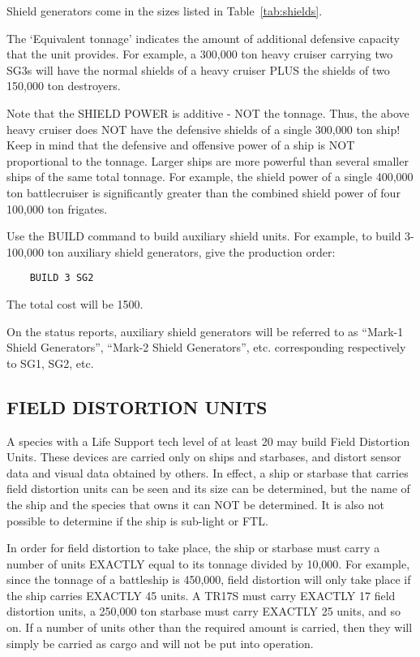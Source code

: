\documentclass[10pt,titlepage]{article}
\begin{document}
Shield generators come in the sizes listed in Table~\ref{tab:shields}.

The `Equivalent tonnage' indicates the amount of additional defensive capacity
that the unit provides.  For example, a 300,000 ton heavy cruiser carrying two
SG3s will have the normal shields of a heavy cruiser PLUS the shields of two
150,000 ton destroyers.

\begin{informationnote}
Note that the SHIELD POWER is additive - NOT the tonnage.  Thus, the above
heavy cruiser does NOT have the defensive shields of a single 300,000 ton
ship!  Keep in mind that the defensive and offensive power of a ship is NOT
proportional to the tonnage.  Larger ships are more powerful than several
smaller ships of the same total tonnage.  For example, the shield power of a
single 400,000 ton battlecruiser is significantly greater than the combined
shield power of four 100,000 ton frigates.
\end{informationnote}

Use the BUILD command to build auxiliary shield units.  For example, to build
3-100,000 ton auxiliary shield generators, give the production order:

\begin{verbatim}
	BUILD 3 SG2\end{verbatim} 

\noindent The total cost will be 1500.

\noindent On the status reports, auxiliary shield generators will be referred to as
``Mark-1 Shield Generators'', ``Mark-2 Shield Generators'', etc. corresponding
respectively to SG1, SG2, etc.

\newpage
\subsection{FIELD DISTORTION UNITS}

A species with a Life Support tech level of at least 20 may build Field
Distortion Units.  These devices are carried only on ships and starbases, and
distort sensor data and visual data obtained by others.  In effect, a ship or
starbase that carries field distortion units can be seen and its size can be
determined, but the name of the ship and the species that owns it can NOT be
determined.  It is also not possible to determine if the ship is sub-light or
FTL.

In order for field distortion to take place, the ship or starbase must carry a
number of units EXACTLY equal to its tonnage divided by 10,000.  For example,
since the tonnage of a battleship is 450,000, field distortion will only take
place if the ship carries EXACTLY 45 units.  A TR17S must carry EXACTLY 17
field distortion units, a 250,000 ton starbase must carry EXACTLY 25 units,
and so on.  If a number of units other than the required amount is carried,
then they will simply be carried as cargo and will not be put into operation.
\end{document}
